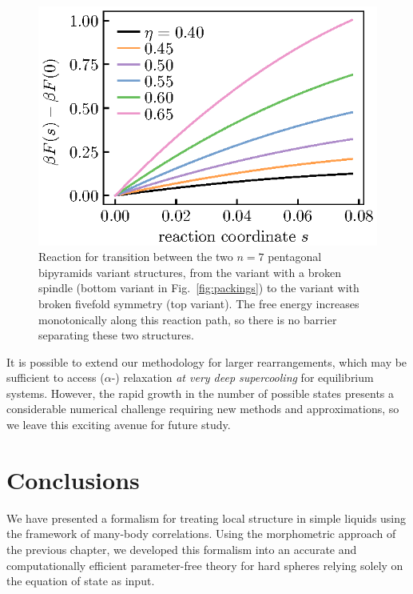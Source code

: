 \documentclass[11pt,twoside]{report}
\begin{document}
\begin{figure}
  \includegraphics[width=0.9\linewidth,outer]{n7-reaction-path}
  \caption[Reaction path for the two variants of the frustrated pentagonal bipyramid]{
    Reaction for transition between the two $n = 7$ pentagonal bipyramids variant structures, from the variant with a broken spindle (bottom variant in Fig.\ \ref{fig:packings}) to the variant with broken fivefold symmetry (top variant).
    The free energy increases monotonically along this reaction path, so there is no barrier separating these two structures.
  }
  \label{fig:reaction-path-7}
\end{figure}

It is possible to extend our methodology for larger rearrangements, which may be sufficient to access ($\alpha$-) relaxation \emph{at very deep supercooling} for equilibrium systems.
However, the rapid growth in the number of possible states presents a considerable numerical challenge requiring new methods and approximations, so we leave this exciting avenue for future study.

\section{Conclusions}

We have presented a formalism for treating local structure in simple liquids using the framework of many-body correlations.
Using the morphometric approach of the previous chapter, we developed this formalism into an accurate and computationally efficient parameter-free theory for hard spheres relying solely on the equation of state as input.
\end{document}
